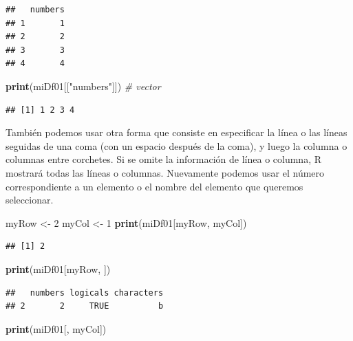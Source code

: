 \documentclass[
]{book}
\newenvironment{Shaded}{\begin{snugshade}}{\end{snugshade}}
\newcommand{\CommentTok}[1]{\textcolor[rgb]{0.56,0.35,0.01}{\textit{#1}}}
\newcommand{\DecValTok}[1]{\textcolor[rgb]{0.00,0.00,0.81}{#1}}
\newcommand{\KeywordTok}[1]{\textcolor[rgb]{0.13,0.29,0.53}{\textbf{#1}}}
\newcommand{\NormalTok}[1]{#1}
\newcommand{\StringTok}[1]{\textcolor[rgb]{0.31,0.60,0.02}{#1}}
\begin{document}
\begin{verbatim}
##   numbers
## 1       1
## 2       2
## 3       3
## 4       4
\end{verbatim}

\begin{Shaded}
\begin{Highlighting}[]
\KeywordTok{print}\NormalTok{(miDf01[[}\StringTok{"numbers"}\NormalTok{]]) }\CommentTok{# vector}
\end{Highlighting}
\end{Shaded}

\begin{verbatim}
## [1] 1 2 3 4
\end{verbatim}

También podemos usar otra forma que consiste en especificar la línea o las líneas seguidas de una coma (con un espacio después de la coma), y luego la columna o columnas entre corchetes. Si se omite la información de línea o columna, R mostrará todas las líneas o columnas. Nuevamente podemos usar el número correspondiente a un elemento o el nombre del elemento que queremos seleccionar.

\begin{Shaded}
\begin{Highlighting}[]
\NormalTok{myRow <-}\StringTok{ }\DecValTok{2}
\NormalTok{myCol <-}\StringTok{ }\DecValTok{1}
\KeywordTok{print}\NormalTok{(miDf01[myRow, myCol])}
\end{Highlighting}
\end{Shaded}

\begin{verbatim}
## [1] 2
\end{verbatim}

\begin{Shaded}
\begin{Highlighting}[]
\KeywordTok{print}\NormalTok{(miDf01[myRow, ])}
\end{Highlighting}
\end{Shaded}

\begin{verbatim}
##   numbers logicals characters
## 2       2     TRUE          b
\end{verbatim}

\begin{Shaded}
\begin{Highlighting}[]
\KeywordTok{print}\NormalTok{(miDf01[, myCol])}
\end{Highlighting}
\end{Shaded}
\end{document}
